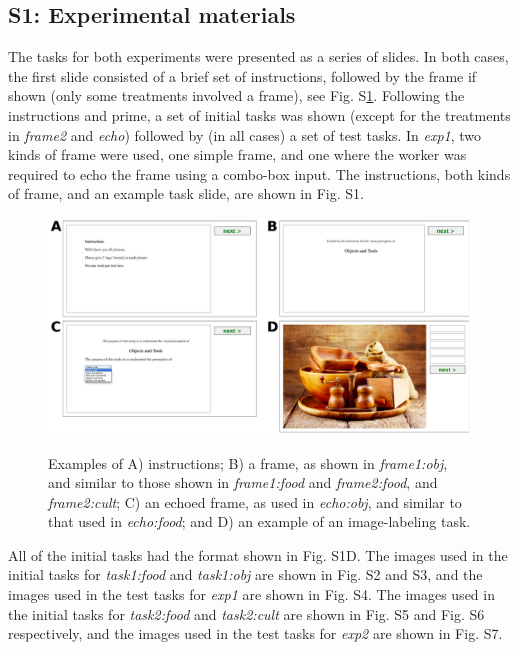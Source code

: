 \documentclass[12pt]{article}
\begin{document}
\subsection*{S1: Experimental materials}
The tasks for both experiments were presented as a series of slides.  In
both cases, the first slide consisted of a brief set of instructions, followed
by the frame if shown (only some treatments involved a frame), see 
Fig. S\ref{fig:hit_preamble}.  Following the instructions and prime, a set
of initial tasks was shown (except for the treatments in \textit{frame2}
and \textit{echo}) followed by (in all cases) a set of test tasks.  In
\textit{exp1}, two kinds of frame were used, one simple frame, and one where
the worker was required to echo the frame using a combo-box input.  The
instructions, both kinds of frame, and an example task slide, are shown 
in Fig. S1.
\begin{figure}
	\includegraphics[scale=0.8]{figs/tasks.pdf}
	\label{fig:hit_preamble}
	\caption{Examples of A) instructions; B) a frame, as shown in 
		\textit{frame1:obj}, and similar to those shown in 
		\textit{frame1:food} and \textit{frame2:food}, and 
		\textit{frame2:cult};  
		C) an echoed frame, as used in \textit{echo:obj}, and similar to that
		used in \textit{echo:food}; and D) an 
		example of an image-labeling task.
	}
\end{figure}

All of the initial tasks had the format shown in Fig. S1D.  The images used
in the initial tasks for \textit{task1:food} and \textit{task1:obj} are
shown in Fig. S2 and S3, and the images used in the test tasks for 
\textit{exp1} are shown in Fig. S4.  The images used in the initial tasks
for \textit{task2:food} and \textit{task2:cult} are shown in Fig. S5 and
Fig. S6 respectively, and the images used in the test tasks for \textit{exp2} 
are shown in Fig. S7.
\end{document}
